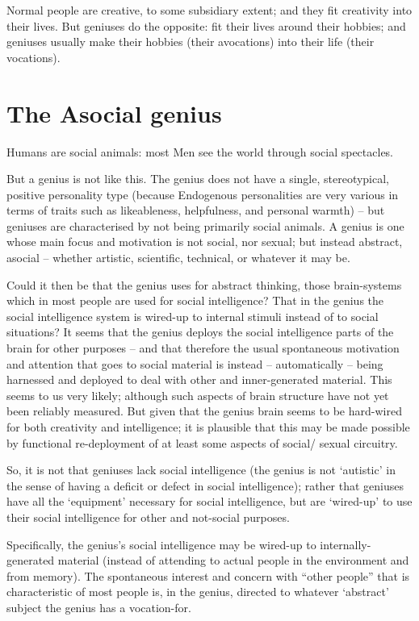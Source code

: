 \documentclass[
]{book}
\begin{document}
Normal people are creative, to some subsidiary extent; and they fit creativity into their lives. But geniuses do the opposite: fit their lives around their hobbies; and geniuses usually make their hobbies (their avocations) into their life (their vocations).

\hypertarget{the-asocial-genius}{%
\section{The Asocial genius}\label{the-asocial-genius}}

Humans are social animals: most Men see the world through social spectacles.

But a genius is not like this. The genius does not have a single, stereotypical, positive personality type (because Endogenous personalities are very various in terms of traits such as likeableness, helpfulness, and personal warmth) -- but geniuses are characterised by not being primarily social animals. A genius is one whose main focus and motivation is not social, nor sexual; but instead abstract, asocial -- whether artistic, scientific, technical, or whatever it may be.

Could it then be that the genius uses for abstract thinking, those brain-systems which in most people are used for social intelligence? That in the genius the social intelligence system is wired-up to internal stimuli instead of to social situations? It seems that the genius deploys the social intelligence parts of the brain for other purposes -- and that therefore the usual spontaneous motivation and attention that goes to social material is instead -- automatically -- being harnessed and deployed to deal with other and inner-generated material. This seems to us very likely; although such aspects of brain structure have not yet been reliably measured. But given that the genius brain seems to be hard-wired for both creativity and intelligence; it is plausible that this may be made possible by functional re-deployment of at least some aspects of social/ sexual circuitry.

So, it is not that geniuses lack social intelligence (the genius is not `autistic' in the sense of having a deficit or defect in social intelligence); rather that geniuses have all the `equipment' necessary for social intelligence, but are `wired-up' to use their social intelligence for other and not-social purposes.

Specifically, the genius's social intelligence may be wired-up to internally-generated material (instead of attending to actual people in the environment and from memory). The spontaneous interest and concern with ``other people'' that is characteristic of most people is, in the genius, directed to whatever `abstract' subject the genius has a vocation-for.
\end{document}
